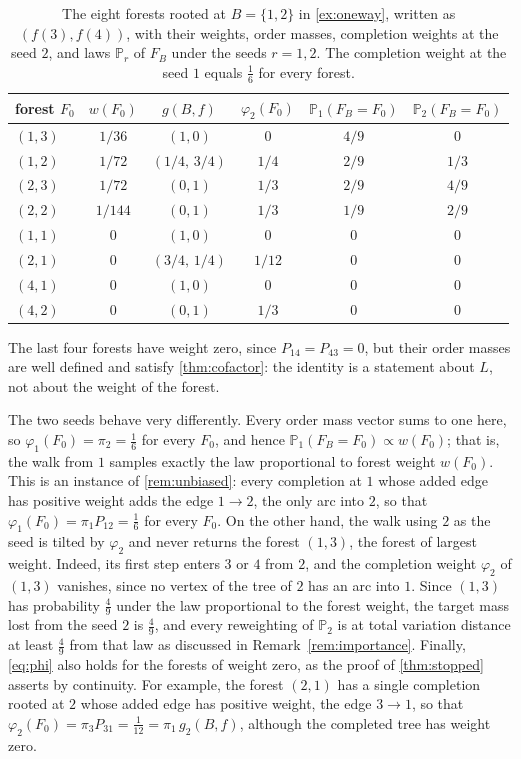 \documentclass[onefignum,onetabnum,nohypdvips]{siamart250211}
\numberwithin{theorem}{section}
\numberwithin{equation}{section}
\newcommand{\pr}{\mathbb{P}}
\begin{document}
\begin{example}
\begin{table}[ht]
\caption{The eight forests rooted at $B=\{1,2\}$ in \cref{ex:oneway},
written as $(f(3),f(4))$, with their weights, order masses, completion
weights at the seed $2$, and laws $\pr_r$ of $F_B$ under the seeds
$r=1,2$. The completion weight at the seed $1$ equals $\tfrac16$ for
every forest.}\label{tab:oneway-forests}
\centering
\small
\begin{tabular}{@{}lccccc@{}}
\toprule
forest $F_0$ & $w(F_0)$ & $g(B,f)$ & $\varphi_2(F_0)$ & $\pr_1(F_B=F_0)$ & $\pr_2(F_B=F_0)$\\
\midrule
$(1,3)$ & $1/36$ & $(1,0)$ & $0$ & $4/9$ & $0$\\
$(1,2)$ & $1/72$ & $(1/4,\,3/4)$ & $1/4$ & $2/9$ & $1/3$\\
$(2,3)$ & $1/72$ & $(0,1)$ & $1/3$ & $2/9$ & $4/9$\\
$(2,2)$ & $1/144$ & $(0,1)$ & $1/3$ & $1/9$ & $2/9$\\
$(1,1)$ & $0$ & $(1,0)$ & $0$ & $0$ & $0$\\
$(2,1)$ & $0$ & $(3/4,\,1/4)$ & $1/12$ & $0$ & $0$\\
$(4,1)$ & $0$ & $(1,0)$ & $0$ & $0$ & $0$\\
$(4,2)$ & $0$ & $(0,1)$ & $1/3$ & $0$ & $0$\\
\bottomrule
\end{tabular}
\end{table}

The last four forests have weight zero, since $P_{14}=P_{43}=0$, but their order
masses are well defined and satisfy \cref{thm:cofactor}: the identity
is a statement about $L$, not about the weight of the forest.

The two seeds behave very differently. Every order mass vector sums to
one here, so $\varphi_1(F_0)=\pi_2=\tfrac16$ for every $F_0$, and hence $\pr_1(F_B=F_0)\propto w(F_0)$; that is, the walk from $1$
samples exactly the law proportional to forest weight $w(F_0)$. This is an instance of
\cref{rem:unbiased}: every completion at $1$ whose added edge has
positive weight adds the edge $1\to2$, the only arc into $2$, so that
$\varphi_1(F_0)=\pi_1P_{12}=\tfrac16$ for every $F_0$. On the other hand,
the walk using $2$ as the seed is tilted by $\varphi_2$ and never returns the forest
$(1,3)$, the forest of largest weight. Indeed, its first step enters
$3$ or $4$ from $2$, and the completion weight $\varphi_2$ of $(1,3)$
vanishes, since no vertex of the tree of $2$ has an arc into $1$. Since
$(1,3)$ has probability $\tfrac49$ under the law proportional to the
forest weight, the target mass lost from the seed $2$ is $\tfrac49$, and
every reweighting of $\pr_2$ is at total variation distance at least
$\tfrac49$ from that law as discussed in Remark~\ref{rem:importance}.
Finally, \eqref{eq:phi} also holds for the forests of weight zero, as
the proof of \cref{thm:stopped} asserts by continuity. For example,
the forest $(2,1)$ has a single completion rooted at $2$ whose added
edge has positive weight, the edge $3\to1$, so that
$\varphi_2(F_0)=\pi_3P_{31}=\tfrac1{12}=\pi_1\,g_2(B,f)$, although the
completed tree has weight zero.
\end{example}
\end{document}
